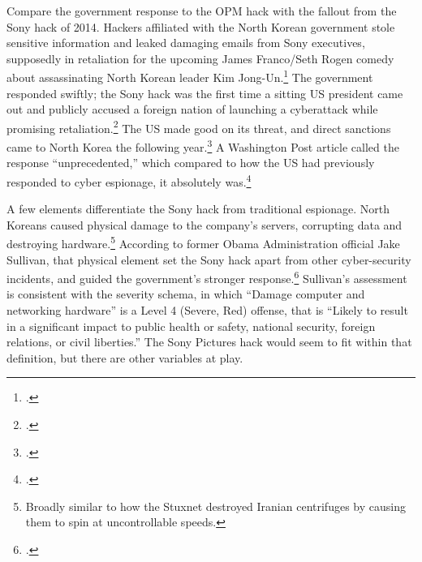 \documentclass{memoir}
\begin{document}
\begin{refsegment}

Compare the government response to the OPM hack with the fallout from the Sony hack of 2014. Hackers affiliated with the North Korean government stole sensitive information and leaked damaging emails from Sony executives, supposedly in retaliation for the upcoming James Franco/Seth Rogen comedy about assassinating North Korean leader Kim Jong-Un.\footcite{barnes_sony_2017} The government responded swiftly; the Sony hack was the first time a sitting US president came out and publicly accused a foreign nation of launching a cyberattack while promising retaliation.\footcite{sanger_u.s._2016} The US made good on its threat, and direct sanctions came to North Korea the following year.\footcite{lederman_us_2015} A Washington Post article called the response ``unprecedented,'' which compared to how the US had previously responded to cyber espionage, it absolutely was.\footcite{nakashima_why_2015}

A few elements differentiate the Sony hack from traditional espionage. North Koreans caused physical damage to the company's servers, corrupting data and destroying hardware.\footnote{Broadly similar to how the Stuxnet destroyed Iranian centrifuges by causing them to spin at uncontrollable speeds.} According to former Obama Administration official Jake Sullivan, that physical element set the Sony hack apart from other cyber-security incidents, and guided the government's stronger response.\footcite[Jake Sullivan served as the Deputy Assistant to the President and National Security Advisor to the Vice President. Piror to that, he was the Director of Policy Planning at the State Department.]{sullivan_personal_2019} Sullivan's assessment is consistent with the severity schema, in which ``Damage computer and networking hardware'' is a Level 4 (Severe, Red) offense, that is ``Likely to result in a significant impact to public health or safety, national security, foreign relations, or civil liberties.'' The Sony Pictures hack would seem to fit within that definition, but there are other variables at play.


\end{refsegment}
\end{document}
